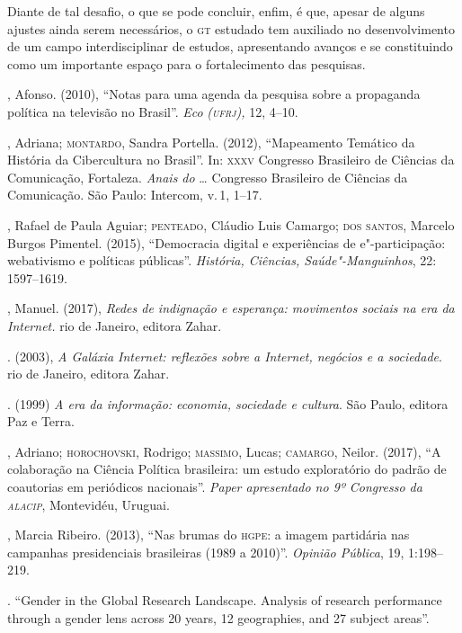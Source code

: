 Diante de tal desafio, o que se pode concluir, enfim, é que, apesar de
alguns ajustes ainda serem necessários, o \textsc{gt} estudado tem auxiliado no
desenvolvimento de um campo interdisciplinar de estudos, apresentando
avanços e se constituindo como um importante espaço para o
fortalecimento das pesquisas.

\begin{bibliohedra}
, Afonso. (2010), ``Notas para uma agenda da pesquisa sobre a
propaganda política na televisão no Brasil''. \textit{Eco} \textit{(\textsc{ufrj}),}
12, 4--10.

, Adriana; \textsc{montardo}, Sandra Portella. (2012), ``Mapeamento
Temático da História da Cibercultura no Brasil''. In: \textsc{xxxv} Congresso
Brasileiro de Ciências da Comunicação, Fortaleza. \textit{Anais do} \ldots{}
Congresso Brasileiro de Ciências da Comunicação. São Paulo: Intercom, v.\,1, 1--17.

, Rafael de Paula Aguiar; \textsc{penteado}, Cláudio Luis Camargo; \textsc{dos
santos}, Marcelo Burgos Pimentel. (2015), ``Democracia digital e
experiências de e"-participação: webativismo e políticas públicas''.
\textit{História, Ciências, Saúde"-Manguinhos}, 22: 1597--1619.

, Manuel. (2017), \textit{Redes de indignação e esperança:
movimentos sociais na era da Internet.} rio de Janeiro, editora Zahar.

\titidem. (2003), \textit{A Galáxia Internet: reflexões sobre a
Internet, negócios e a sociedade}. rio de Janeiro, editora Zahar.

\titidem. (1999) \textit{A era da informação: economia, sociedade
e cultura}. São Paulo, editora Paz e Terra.

, Adriano; \textsc{horochovski}, Rodrigo; \textsc{massimo}, Lucas; \textsc{camargo}, Neilor.
(2017), ``A colaboração na Ciência Política brasileira: um estudo
exploratório do padrão de coautorias em periódicos nacionais''.
\textit{Paper apresentado no 9º Congresso da \textsc{alacip}}, Montevidéu,
Uruguai.

, Marcia Ribeiro. (2013), ``Nas brumas do \textsc{hgpe}: a imagem partidária
nas campanhas presidenciais brasileiras (1989 a 2010)''. \textit{Opinião
Pública}, 19, 1:198--219.

. ``Gender in the Global Research Landscape. Analysis of
research performance through a gender lens across 20 years, 12
geographies, and 27 subject areas''. 


\end{bibliohedra}
